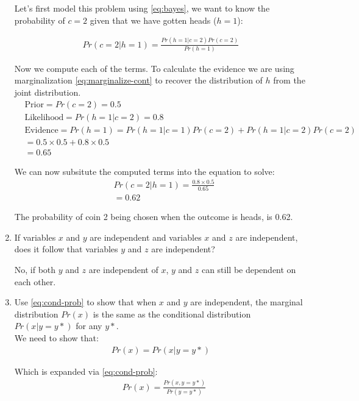 \documentclass{article}
\begin{document}
\begin{enumerate}
Let's first model this problem using \ref{eq:bayes}, we want to know the probability of $c=2$ given that we have gotten heads ($h=1$):

\begin{align*}
	Pr\left( c=2|h=1 \right) = \frac{Pr\left( h=1|c=2 \right) Pr\left( c=2 \right) }{Pr\left( h=1 \right) }
\end{align*}

Now we compute each of the terms. To calculate the evidence we are using marginalization \ref{eq:marginalize-cont} to recover the distribution of $h$ from the joint distribution.
\begin{align*}
	&\text{Prior}=Pr\left( c=2 \right) = 0.5 \\
	&\text{Likelihood}=Pr\left( h=1|c=2 \right) = 0.8 \\
	&\text{Evidence}=Pr\left( h=1 \right) = Pr(h=1|c=1)Pr(c=2) + Pr\left( h=1|c=2 \right) Pr(c=2)\\
	&= 0.5 \times 0.5 + 0.8 \times 0.5\\
	&= 0.65
\end{align*}


We can now subsitute the computed terms into the equation to solve:
\begin{align*}
	&Pr\left( c=2|h=1 \right) = \frac{0.8 \times 0.5}{0.65} \\
	&=0.62
\end{align*}

The probability of coin 2 being chosen when the outcome is heads, is 0.62.

\item If variables $x$ and $y$ are independent and variables $x$ and $z$ are independent, does it follow that variables $y$ and $z$ are independent?

No, if both $y$ and $z$ are independent of $x$, $y$ and $z$ can still be dependent on each other.

\item Use \ref{eq:cond-prob} to show that when $x$ and $y$ are independent, the marginal distribution $Pr(x)$ is the same as the conditional distribution $Pr(x|y=y*)$ for any $y*$. \\

We need to show that:
\begin{align*}
	Pr\left( x \right) = Pr\left( x|y=y* \right) 
\end{align*}

Which is expanded via \ref{eq:cond-prob}:
\begin{align*}
	&Pr\left( x \right) = \frac{Pr\left( x,y=y* \right) }{Pr\left( y=y* \right) }
\end{align*}


\end{enumerate}
\end{document}
